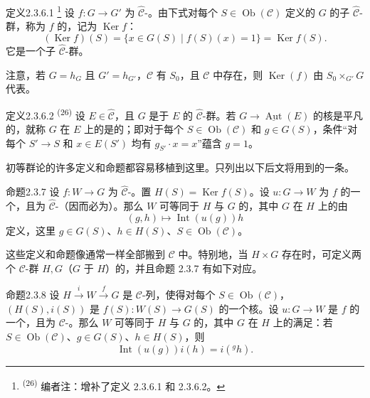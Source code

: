 \begin{SGAresult}{定义}{2.3.6.1}
\footnote{\textsuperscript{(26)} 编者注：增补了定义 2.3.6.1 和 2.3.6.2。}
设 $f:G\to G'$ 为 $\widehat{\mathcal C}$-。由下式对每个 $S\in\operatorname{Ob}(\mathcal C)$ 定义的 $G$ 的子 $\widehat{\mathcal C}$-群，称为 $f$ 的，记为 $\operatorname{Ker}f$：
\[
(\operatorname{Ker}f)(S)=\{x\in G(S)\mid f(S)(x)=1\}=\operatorname{Ker}f(S).
\]
它是一个子 $\widehat{\mathcal C}$-群。
\end{SGAresult}
注意，若 $G=h_G$ 且 $G'=h_{G'}$，$\mathcal C$ 有 $S_0$，且 $\mathcal C$ 中存在，则 $\operatorname{Ker}(f)$ 由 $S_0\times_{G'}G$ 代表。

\begin{SGAresult}{定义}{2.3.6.2}
\textsuperscript{(26)} 设 $E\in\widehat{\mathcal C}$，且 $G$ 是于 $E$ 的 $\widehat{\mathcal C}$-群。若 $G\to\underline{\operatorname{Aut}}(E)$ 的核是平凡的，就称 $G$ 在 $E$ 上的是的；即对于每个 $S\in\operatorname{Ob}(\mathcal C)$ 和 $g\in G(S)$，条件“对每个 $S'\to S$ 和 $x\in E(S')$ 均有 $g_{S'}\cdot x=x$”蕴含 $g=1$。
\end{SGAresult}
初等群论的许多定义和命题都容易移植到这里。只列出以下后文将用到的一条。
\begin{SGAresult}{命题}{2.3.7}
设 $f:W\to G$ 为 $\widehat{\mathcal C}$-。置 $H(S)=\operatorname{Ker}f(S)$。设 $u:G\to W$ 为 $f$ 的一个，且为 $\widehat{\mathcal C}$-（因而必为）。那么 $W$ 可等同于 $H$ 与 $G$ 的，其中 $G$ 在 $H$ 上的由
\[
(g,h)\longmapsto\operatorname{Int}(u(g))h
\]
定义，这里 $g\in G(S)$、$h\in H(S)$、$S\in\operatorname{Ob}(\mathcal C)$。
\end{SGAresult}
这些定义和命题像通常一样全部搬到 $\mathcal C$ 中。特别地，当 $H\times G$ 存在时，可定义两个 $\mathcal C$-群 $H,G$（$G$ 于 $H$）的，并且命题 2.3.7 有如下对应。
\begin{SGAresult}{命题}{2.3.8}
设 $H\xrightarrow{i}W\xrightarrow{f}G$ 是 $\mathcal C$-列，使得对每个 $S\in\operatorname{Ob}(\mathcal C)$，$(H(S),i(S))$ 是 $f(S):W(S)\to G(S)$ 的一个核。设 $u:G\to W$ 是 $f$ 的一个，且为 $\mathcal C$-。那么 $W$ 可等同于 $H$ 与 $G$ 的，其中 $G$ 在 $H$ 上的满足：若 $S\in\operatorname{Ob}(\mathcal C)$、$g\in G(S)$、$h\in H(S)$，则
\[
\operatorname{Int}(u(g))i(h)=i({}^gh).
\]
\end{SGAresult}
